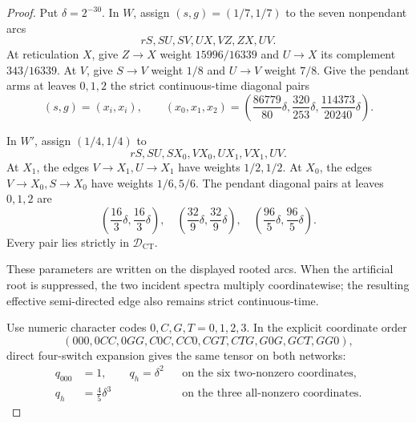 \documentclass[11pt]{article}
\theoremstyle{remark}
\newcommand{\Dct}{\mathcal D_{\mathrm{CT}}}
\newcommand{\1}{\mathbf 1}
\begin{document}
\begin{proof}
Put \(\delta=2^{-30}\).  In \(W\), assign \((s,g)=(1/7,1/7)\) to the seven
nonpendant arcs
\[
 rS,SU,SV,UX,VZ,ZX,UV.
\]
At reticulation \(X\), give \(Z\to X\) weight \(15996/16339\) and
\(U\to X\) its complement \(343/16339\).  At \(V\), give \(S\to V\)
weight \(1/8\) and \(U\to V\) weight \(7/8\).  Give the pendant arms at
leaves \(0,1,2\) the strict continuous-time diagonal pairs
\[
 (s,g)=(x_i,x_i),\qquad
 (x_0,x_1,x_2)=
 \left(\frac{86779}{80}\delta,
       \frac{320}{253}\delta,
       \frac{114373}{20240}\delta\right).
\]

In \(W'\), assign \((1/4,1/4)\) to
\[
 rS,SU,SX_0,VX_0,UX_1,VX_1,UV.
\]
At \(X_1\), the edges \(V\to X_1,U\to X_1\) have weights \(1/2,1/2\).
At \(X_0\), the edges \(V\to X_0,S\to X_0\) have weights \(1/6,5/6\).
The pendant diagonal pairs at leaves \(0,1,2\) are
\[
 \left(\frac{16}{3}\delta,\frac{16}{3}\delta\right),\quad
 \left(\frac{32}{9}\delta,\frac{32}{9}\delta\right),\quad
 \left(\frac{96}{5}\delta,\frac{96}{5}\delta\right).
\]
Every pair lies strictly in \(\Dct\).

These parameters are written on the displayed rooted arcs.  When the
artificial root is suppressed, the two incident spectra multiply
coordinatewise; the resulting effective semi-directed edge also remains
strict continuous-time.

Use numeric character codes \(0,C,G,T=0,1,2,3\).  In the explicit coordinate
order
\begin{equation}\label{eq:sharp-order}
 (000,0CC,0GG,C0C,CC0,CGT,CTG,G0G,GCT,GG0),
\end{equation}
direct four-switch expansion gives the same tensor on both networks:
\begin{align*}
 q_{000}&=1,\qquad
 q_h=\delta^2 &&\text{on the six two-nonzero coordinates},\\
 q_h&=\frac45\delta^3 &&\text{on the three all-nonzero coordinates}.
\end{align*}


\end{proof}
\end{document}
